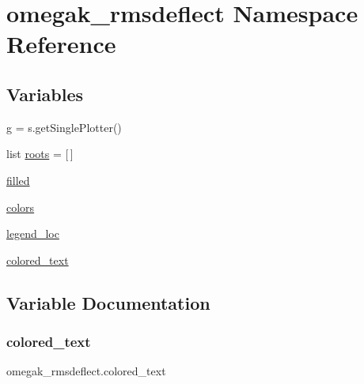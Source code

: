 \hypertarget{namespaceomegak__rmsdeflect}{}\section{omegak\+\_\+rmsdeflect Namespace Reference}
\label{namespaceomegak__rmsdeflect}
\subsection*{Variables}
\begin{DoxyCompactItemize}
\item 
\mbox{\hyperlink{namespaceomegak__rmsdeflect_af3e00da7905da45ea50e7bbc8c8274d8}{g}} = s.\+get\+Single\+Plotter()
\item 
list \mbox{\hyperlink{namespaceomegak__rmsdeflect_a1b3c490e1e1d94eb3037e1693dca2028}{roots}} = \mbox{[}$\,$\mbox{]}
\item 
\mbox{\hyperlink{namespaceomegak__rmsdeflect_a72c2ae1301a49b64d5481c5ad9a381e2}{filled}}
\item 
\mbox{\hyperlink{namespaceomegak__rmsdeflect_a9fe2039bcd1b8b65ff2fba7887fee695}{colors}}
\item 
\mbox{\hyperlink{namespaceomegak__rmsdeflect_acba5fafc58df39beb9740f4958d4afa1}{legend\+\_\+loc}}
\item 
\mbox{\hyperlink{namespaceomegak__rmsdeflect_ae1f8fad9d58f113557b2a1b18fbe9de1}{colored\+\_\+text}}
\end{DoxyCompactItemize}


\subsection{Variable Documentation}
\mbox{\label{namespaceomegak__rmsdeflect_ae1f8fad9d58f113557b2a1b18fbe9de1}} 
\subsubsection{\texorpdfstring{colored\+\_\+text}{colored\_text}}
{\footnotesize\ttfamily omegak\+\_\+rmsdeflect.\+colored\+\_\+text}

\mbox{\label{namespaceomegak__rmsdeflect_a9fe2039bcd1b8b65ff2fba7887fee695}} 
